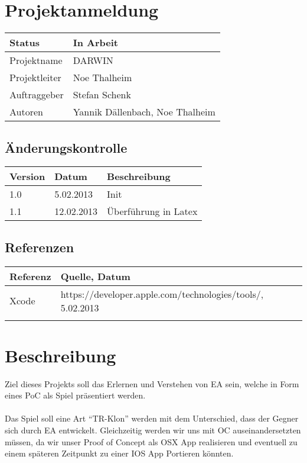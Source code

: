 \documentclass{scrartcl}
\begin{document}
	\section*{Projektanmeldung}
	\begin{tabularx}{\textwidth}{| X | X |}
	\hline
	Status & In Arbeit\\
	\hline
	Projektname & DARWIN\\
	\hline
	Projektleiter & Noe Thalheim\\
	\hline
	Auftraggeber & Stefan Schenk\\
	\hline
	Autoren & Yannik Dällenbach, Noe Thalheim\\
	\hline
	\end{tabularx}
	
	\subsection*{Änderungskontrolle}
	\begin{tabularx}{\textwidth}{| X | X | X |}
	\hline
	\rowcolor[gray]{0.9} Version & Datum & Beschreibung\\
	\hline
	1.0 & 5.02.2013 & Init\\
	\hline
	1.1 & 12.02.2013 & Überführung in Latex\\
	\hline
	\end{tabularx}
	
	\subsection*{Referenzen}
	
	\begin{tabular}{| l | l | }
	\hline
	\rowcolor[gray]{0.9} Referenz & Quelle, Datum\\
	\hline
	Xcode & https://developer.apple.com/technologies/tools/, 5.02.2013\\
	\hline
	 & \\
	\hline
	\end{tabular}
	
	\tableofcontents
	\pagebreak
	\section{Beschreibung}
	Ziel dieses Projekts soll das Erlernen und Verstehen von \Gls{EA} sein, welche in Form eines \Gls{PoC} als Spiel präsentiert werden.  
	\\\\
	Das Spiel soll eine Art “\Gls{TR}-Klon” werden mit dem Unterschied, dass der Gegner sich durch \Gls{EA} entwickelt. Gleichzeitig werden wir uns mit \Gls{OC} auseinandersetzten müssen, da wir unser Proof of Concept als \Gls{OSX} App realisieren und eventuell zu einem späteren Zeitpunkt zu einer \gls{IOS} App Portieren könnten.
\end{document}
